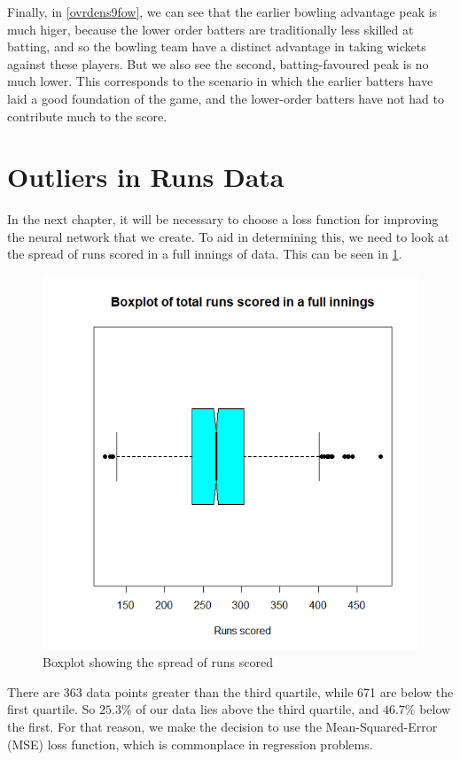 Finally, in \ref{ovrdens9fow}, we can see that the earlier bowling advantage peak is much higer, because the lower order batters are traditionally less skilled 
at batting, and so the bowling team have a distinct advantage in taking wickets against these players. But we also see the second, batting-favoured peak is no much lower.
This corresponds to the scenario in which the earlier batters have laid a good foundation of the game, and the lower-order batters have not had to contribute much to the score.

\section{Outliers in Runs Data}
\label{mse}
In the next chapter, it will be necessary to choose a loss function for improving the neural network that we create. To aid in determining this, we need to look at the
spread of runs scored in a full innings of data. This can be seen in \ref{runsbox}.

\begin{figure}[h]
    \centering
    \includegraphics[scale=0.5]{figures/runsbox.png}
    \caption{Boxplot showing the spread of runs scored}
    \label{runsbox}
\end{figure}

There are 363 data points greater than the third quartile, while 671 are below the first quartile. So $25.3\%$ of our data lies above the third quartile, and
$46.7\%$ below the first. For that reason, we make the decision to use the Mean-Squared-Error (MSE) loss function, which is commonplace in regression problems.

